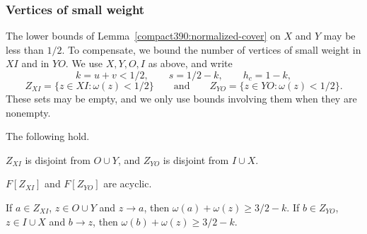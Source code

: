\subsubsection{Vertices of small weight}
The lower bounds of Lemma~\ref{compact390:normalized-cover} on $X$ and $Y$ may be less than $1/2$. To compensate, we bound the number of vertices of small weight in $XI$ and in $YO$. We use $X,Y,O,I$ as above, and write
\[
 k=u+v<1/2,\qquad s=1/2-k,\qquad h_c=1-k,
\]
\[
 Z_{XI}=\{z\in XI:\omega(z)<1/2\}\qquad\text{and}\qquad
 Z_{YO}=\{z\in YO:\omega(z)<1/2\}.
\]
These sets may be empty, and we only use bounds involving them when they are nonempty.

\begin{lemma}
\label{compact390:run-constraints}
The following hold.
\begin{props}
\item\label{run:disjoint} $Z_{XI}$ is disjoint from $O\cup Y$, and $Z_{YO}$ is disjoint from $I\cup X$.
\item\label{run:acyclic} $F[Z_{XI}]$ and $F[Z_{YO}]$ are acyclic.
\item\label{run:edges} If $a\in Z_{XI}$, $z\in O\cup Y$ and $z\to a$, then $\omega(a)+\omega(z)\ge3/2-k$. If $b\in Z_{YO}$, $z\in I\cup X$ and $b\to z$, then $\omega(b)+\omega(z)\ge3/2-k$.
\end{props}
\end{lemma}
